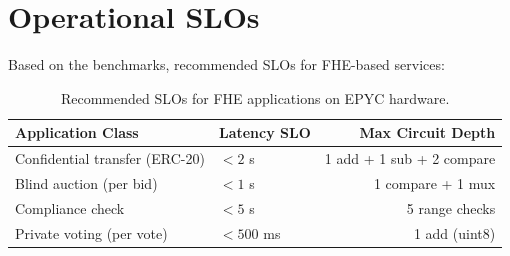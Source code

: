 \section{Operational SLOs}


Based on the benchmarks, recommended SLOs for FHE-based services:

\begin{table}[h]
\centering
\begin{tabular}{@{}llr@{}}
\toprule
\textbf{Application Class} & \textbf{Latency SLO} & \textbf{Max Circuit Depth} \\
\midrule
Confidential transfer (ERC-20) & $< 2$ s & 1 add + 1 sub + 2 compare \\
Blind auction (per bid) & $< 1$ s & 1 compare + 1 mux \\
Compliance check & $< 5$ s & 5 range checks \\
Private voting (per vote) & $< 500$ ms & 1 add (uint8) \\
\bottomrule
\end{tabular}
\caption{Recommended SLOs for FHE applications on EPYC hardware.}
\label{tab:slos}
\end{table}

